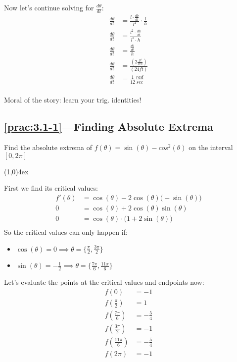 \documentclass{MathNotes}
\newcommand{\continued}{
	\mbox{}
	\vfill
	\textbf{Continued on Next Page\ldots}\newpage
}
\newcommand{\br}{
	\begin{center}
		\line(1,0){4ex}
	\end{center}}
\begin{document}
Now let's continue solving for $\frac{d\theta}{dt}$:
\begin{align*}
	\frac{d\theta}{dt} & =\frac{l\cdot\frac{db}{dt}}{l^2}\cdot\frac{l}{h} \\
	\frac{d\theta}{dt} & =\frac{l^2\cdot\frac{db}{dt}}{l^2\cdot h}        \\
	\frac{d\theta}{dt} & =\frac{\frac{db}{dt}}{h}                         \\
	\frac{d\theta}{dt} & =\frac{(2\frac{ft}{sec})}{(24ft)}                \\
	\frac{d\theta}{dt} & =\frac{1}{12}\frac{rad}{sec}                     \\
\end{align*}

Moral of the story: learn your trig. identities!
\newpage
\subsection*{\ref{prac:3.1-1}---Finding Absolute Extrema}\label{ans:3.1-1}
Find the absolute extrema of $f(\theta)=\sin(\theta)-cos^2(\theta)$ on
the interval $[0, 2\pi]$
\br
First we find its critical values:
\begin{align*}
	f'(\theta) & =\cos(\theta)-2\cos(\theta)\big(-\sin(\theta)\big) \\
	0          & =\cos(\theta)+2\cos(\theta)\sin(\theta)            \\
	0          & =\cos(\theta)\cdot\big(1+2\sin(\theta)\big)        \\
\end{align*}
So the critical values can only happen if:
\begin{multicols}{2}
	\begin{itemize}
		\item $\cos(\theta)=0\implies\theta=\{\frac{\pi}{2}, \frac{3\pi}{2}\}$
		\item $\sin(\theta)=-\frac{1}{2}\implies\theta=\{\frac{7\pi}{6},
			      \frac{11\pi}{6}\}$
	\end{itemize}
\end{multicols}

Let's evaluate the points at the critical values and endpoints now:
\begin{align*}
	f(0)               & =-1           \\
	f(\frac{\pi}{2})   & =1            \\
	f(\frac{7\pi}{6})  & =-\frac{5}{4} \\
	f(\frac{3\pi}{2})  & =-1           \\
	f(\frac{11\pi}{6}) & =-\frac{5}{4} \\
	f(2\pi)            & =-1           \\
\end{align*}
\end{document}
